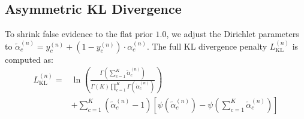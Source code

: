 \documentclass[letterpaper]{article} %
\begin{document}
\subsection{Asymmetric KL Divergence}
To shrink false evidence to the flat prior $1.0$, we adjust the Dirichlet parameters to $\tilde{\alpha}_c^{(n)} = y_c^{(n)} + (1 - y_c^{(n)}) \cdot \alpha_c^{(n)}$. The full KL divergence penalty $L_{\text{KL}}^{(n)}$ is computed as:
\begin{equation}\label{eq:kl_loss_n}
\begin{aligned}
    L_{\text{KL}}^{(n)} ={}& \ln \left( \frac{\Gamma\left(\sum_{c=1}^K \tilde{\alpha}_c^{(n)}\right)}{\Gamma(K) \prod_{c=1}^K \Gamma(\tilde{\alpha}_c^{(n)})} \right) \\
    &+ \sum_{c=1}^K (\tilde{\alpha}_c^{(n)} - 1)\left[\psi(\tilde{\alpha}_c^{(n)}) - \psi\!\left(\sum_{c=1}^K \tilde{\alpha}_c^{(n)}\right)\right]
\end{aligned}
\end{equation}
\end{document}
